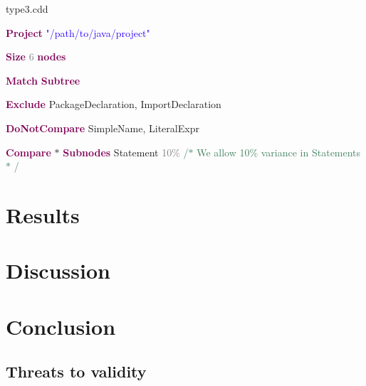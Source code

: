 \documentclass[sigplan,10pt,review,anonymous]{acmart}
\begin{document}
\noindent\makebox[\linewidth]{\rule{\linewidth}{0.4pt}}
\noindent type3.cdd\par
\noindent\makebox[\linewidth]{\rule{\linewidth}{0.4pt}}
\noindent \textbf{\textcolor[HTML]{7F0055}{Project}} \textcolor[HTML]{2A00FF}{"/path/to/java/project"}\par
\noindent \textbf{\textcolor[HTML]{7F0055}{Size}} \textcolor[HTML]{7D7D7D}{6} \textbf{\textcolor[HTML]{7F0055}{nodes}}\par
\noindent \textbf{\textcolor[HTML]{7F0055}{Match}} \textbf{\textcolor[HTML]{7F0055}{Subtree}}\par
\noindent \textbf{\textcolor[HTML]{7F0055}{Exclude}} PackageDeclaration, ImportDeclaration\par
\noindent \textbf{\textcolor[HTML]{7F0055}{DoNotCompare}} SimpleName, LiteralExpr\par
\noindent\textbf{\textcolor[HTML]{7F0055}{Compare}} $\ast$  \textbf{\textcolor[HTML]{7F0055}{Subnodes}} Statement \textcolor[HTML]{7D7D7D}{10$\%$}  \textcolor[HTML]{3F7F5F}{/$\ast$  We allow 10$\%$  variance in Statements $\ast$ /}\par
\noindent\makebox[\linewidth]{\rule{\linewidth}{0.4pt}}

\section{Results}

\section{Discussion}

\section{Conclusion}

\subsection{Threats to validity}



%


%

\end{document}
